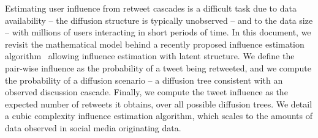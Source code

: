 %
Estimating user influence from retweet cascades is a difficult task due to data availability -- the diffusion structure is typically unobserved -- and to the data size -- with millions of users interacting in short periods of time.
In this document, we revisit the mathematical model behind a recently proposed influence estimation algorithm~\citep{Rizoiu2018a} allowing influence estimation with latent structure.
We define the pair-wise influence as the probability of a tweet being retweeted, and we compute the probability of a diffusion scenario -- a diffusion tree consistent with an observed discussion cascade.
Finally, we compute the tweet influence as the expected number of retweets it obtains, over all possible diffusion trees.
We detail a cubic complexity influence estimation algorithm, which scales to the amounts of data observed in social media originating data.